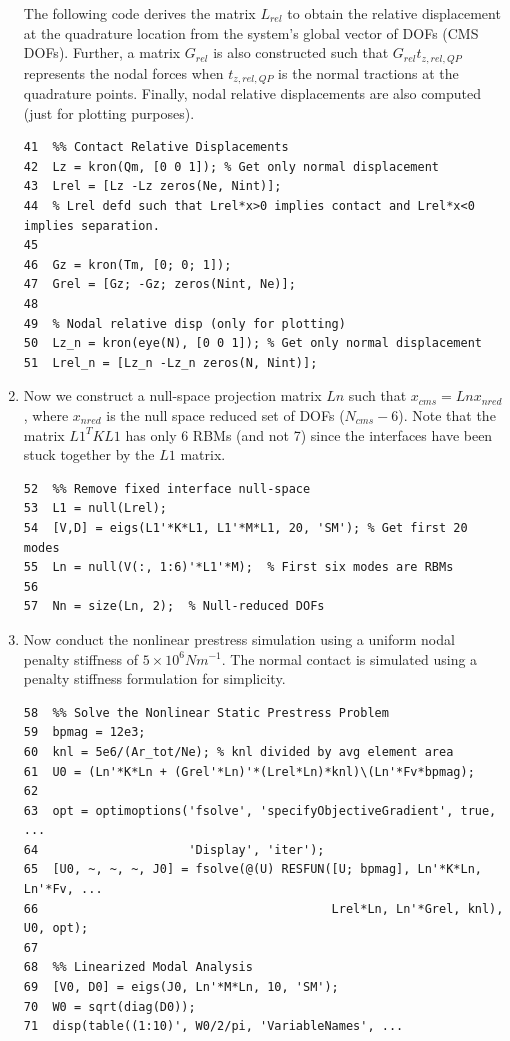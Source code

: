 \documentclass[11pt]{article}
\begin{document}
\begin{enumerate}
The following code derives the matrix \(L_{rel}\) to obtain the relative displacement at the quadrature location from the system's global vector of DOFs (CMS DOFs).
Further, a matrix \(G_{rel}\) is also constructed such that \(G_{rel} t_{z,rel,QP}\) represents the nodal forces when \(t_{z,rel,QP}\) is the normal tractions at the quadrature points.
Finally, nodal relative displacements are also computed (just for plotting purposes).
\begin{verbatim}
41  %% Contact Relative Displacements
42  Lz = kron(Qm, [0 0 1]); % Get only normal displacement
43  Lrel = [Lz -Lz zeros(Ne, Nint)];
44  % Lrel defd such that Lrel*x>0 implies contact and Lrel*x<0 implies separation.
45  
46  Gz = kron(Tm, [0; 0; 1]);
47  Grel = [Gz; -Gz; zeros(Nint, Ne)];
48  
49  % Nodal relative disp (only for plotting)
50  Lz_n = kron(eye(N), [0 0 1]); % Get only normal displacement
51  Lrel_n = [Lz_n -Lz_n zeros(N, Nint)];
\end{verbatim}
\item Now we construct a null-space projection matrix \(Ln\) such that \(x_{cms} = Ln x_{nred}\), where \(x_{nred}\) is the null space reduced set of DOFs (\(N_{cms}-6\)).
Note that the matrix \(L1^T K L1\) has only 6 RBMs (and not 7) since the interfaces have been stuck together by the \(L1\) matrix.
\begin{verbatim}
52  %% Remove fixed interface null-space
53  L1 = null(Lrel);
54  [V,D] = eigs(L1'*K*L1, L1'*M*L1, 20, 'SM'); % Get first 20 modes
55  Ln = null(V(:, 1:6)'*L1'*M);  % First six modes are RBMs
56  
57  Nn = size(Ln, 2);  % Null-reduced DOFs
\end{verbatim}
\item Now conduct the nonlinear prestress simulation using a uniform nodal penalty stiffness of \(5\times 10^6 N m^{-1}\).
The normal contact is simulated using a penalty stiffness formulation for simplicity.
\begin{verbatim}
58  %% Solve the Nonlinear Static Prestress Problem
59  bpmag = 12e3;
60  knl = 5e6/(Ar_tot/Ne); % knl divided by avg element area
61  U0 = (Ln'*K*Ln + (Grel'*Ln)'*(Lrel*Ln)*knl)\(Ln'*Fv*bpmag);
62  
63  opt = optimoptions('fsolve', 'specifyObjectiveGradient', true, ...
64                     'Display', 'iter');
65  [U0, ~, ~, ~, J0] = fsolve(@(U) RESFUN([U; bpmag], Ln'*K*Ln, Ln'*Fv, ...
66                                         Lrel*Ln, Ln'*Grel, knl), U0, opt);
67  
68  %% Linearized Modal Analysis
69  [V0, D0] = eigs(J0, Ln'*M*Ln, 10, 'SM');
70  W0 = sqrt(diag(D0));
71  disp(table((1:10)', W0/2/pi, 'VariableNames', ...

\end{verbatim}
\end{enumerate}
\end{document}
